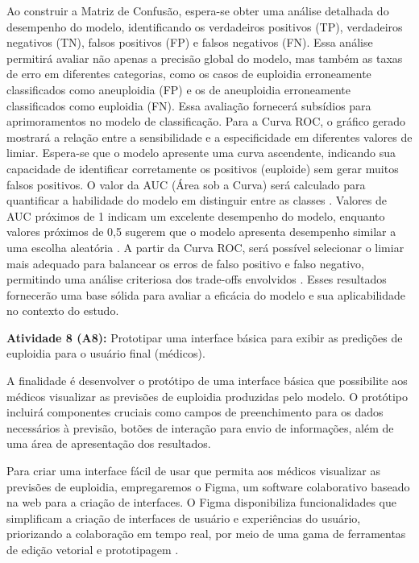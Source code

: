 Ao construir a Matriz de Confusão, espera-se obter uma análise detalhada do desempenho do modelo, identificando os verdadeiros positivos (TP), verdadeiros negativos (TN), falsos positivos (FP) e falsos negativos (FN). Essa análise permitirá avaliar não apenas a precisão global do modelo, mas também as taxas de erro em diferentes categorias, como os casos de euploidia erroneamente classificados como aneuploidia (FP) e os de aneuploidia erroneamente classificados como euploidia (FN). Essa avaliação fornecerá subsídios para aprimoramentos no modelo de classificação. Para a Curva ROC, o gráfico gerado mostrará a relação entre a sensibilidade e a especificidade em diferentes valores de limiar. Espera-se que o modelo apresente uma curva ascendente, indicando sua capacidade de identificar corretamente os positivos (euploide) sem gerar muitos falsos positivos. O valor da AUC (Área sob a Curva) será calculado para quantificar a habilidade do modelo em distinguir entre as classes \cite{vilela2022}. Valores de AUC próximos de 1 indicam um excelente desempenho do modelo, enquanto valores próximos de 0,5 sugerem que o modelo apresenta desempenho similar a uma escolha aleatória \cite{vilela2022}. A partir da Curva ROC, será possível selecionar o limiar mais adequado para balancear os erros de falso positivo e falso negativo, permitindo uma análise criteriosa dos trade-offs envolvidos \cite{vilela2022}. Esses resultados fornecerão uma base sólida para avaliar a eficácia do modelo e sua aplicabilidade no contexto do estudo.

\textbf{Atividade 8 (A8):} Prototipar uma interface básica para exibir as predições de euploidia para o usuário final (médicos).

A finalidade é desenvolver o protótipo de uma interface básica que possibilite aos médicos visualizar as previsões de euploidia produzidas pelo modelo. O protótipo incluirá componentes cruciais como campos de preenchimento para os dados necessários à previsão, botões de interação para envio de informações, além de uma área de apresentação dos resultados.

Para criar uma interface fácil de usar que permita aos médicos visualizar as previsões de euploidia, empregaremos o Figma, um software colaborativo baseado na web para a criação de interfaces. O Figma disponibiliza funcionalidades que simplificam a criação de interfaces de usuário e experiências do usuário, priorizando a colaboração em tempo real, por meio de uma gama de ferramentas de edição vetorial e prototipagem \cite{figma2024}.

